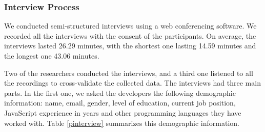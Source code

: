 \subsubsection*{Interview Process} We conducted semi-structured interviews using a web conferencing software. We recorded all the interviews with the consent of the participants. On average, the interviews lasted 26.29 minutes, with the shortest one lasting 14.59 minutes and the longest one 43.06 minutes. 


Two of the researchers conducted the interviews, and a third one listened to all the recordings to cross-validate the collected data.
The interviews had three main parts. In the first one, we asked the developers the following demographic information: name, email, gender, level of education, current job position, JavaScript experience in years and other programming languages they have worked with.
Table \ref{pinterview} summarizes this demographic information.

